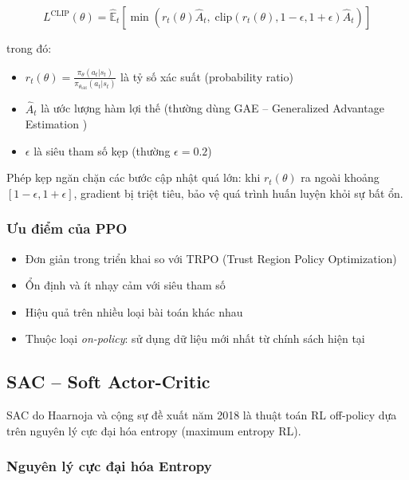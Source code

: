 \begin{equation}
    L^{\text{CLIP}}(\theta) = \hat{\mathbb{E}}_t \left[ \min\left( r_t(\theta) \hat{A}_t,\; \text{clip}\left(r_t(\theta), 1-\epsilon, 1+\epsilon\right) \hat{A}_t \right) \right]
    \label{eq:ppo_clip}
\end{equation}

\noindent trong đó:
\begin{itemize}
    \item $r_t(\theta) = \frac{\pi_\theta(a_t | s_t)}{\pi_{\theta_{\text{old}}}(a_t | s_t)}$ là tỷ số xác suất (probability ratio)
    \item $\hat{A}_t$ là ước lượng hàm lợi thế (thường dùng GAE -- Generalized Advantage Estimation \cite{schulman2015gae})
    \item $\epsilon$ là siêu tham số kẹp (thường $\epsilon = 0.2$)
\end{itemize}

Phép kẹp ngăn chặn các bước cập nhật quá lớn: khi $r_t(\theta)$ ra ngoài khoảng $[1-\epsilon, 1+\epsilon]$, gradient bị triệt tiêu, bảo vệ quá trình huấn luyện khỏi sự bất ổn.

\subsubsection{Ưu điểm của PPO}
\begin{itemize}
    \item Đơn giản trong triển khai so với TRPO (Trust Region Policy Optimization)
    \item Ổn định và ít nhạy cảm với siêu tham số
    \item Hiệu quả trên nhiều loại bài toán khác nhau
    \item Thuộc loại \textit{on-policy}: sử dụng dữ liệu mới nhất từ chính sách hiện tại
\end{itemize}

\subsection{SAC -- Soft Actor-Critic}

SAC do Haarnoja và cộng sự đề xuất năm 2018 \cite{haarnoja2018sac} là thuật toán RL off-policy dựa trên nguyên lý cực đại hóa entropy (maximum entropy RL).

\subsubsection{Nguyên lý cực đại hóa Entropy}

